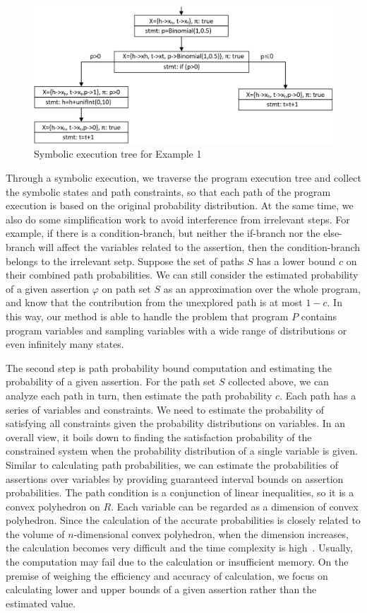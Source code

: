 \documentclass[runningheads]{llncs}
\begin{document}
\begin{figure}[h]
	\centering
	\includegraphics[scale=0.6]{img/executionTree}
	\caption{Symbolic execution tree for Example 1}
	\label{executionTree}
\end{figure}

Through a symbolic execution, we traverse the program execution tree and collect the symbolic states and path constraints, so that each path of the program execution is based on the original probability distribution. At the same time, we also do some simplification work to avoid interference from irrelevant steps. For example, if there is a condition-branch, but neither the if-branch nor the else-branch will affect the variables related to the assertion, then the condition-branch belongs to the irrelevant setp.
Suppose the set of paths $S$ has a lower bound $c$ on their combined path probabilities. We can still consider the estimated probability of a given assertion $\varphi$ on path set $S$ as an approximation over the whole program, and know that the contribution from the unexplored path is at most $1-c$. In this way, our method is able to handle the problem that program $P$ contains program variables and sampling variables with a wide range of distributions or even infinitely many states. 

The second step is path probability bound computation and estimating the probability of a given assertion. 
For the path set $S$ collected above, we can analyze each path in turn, then estimate the path probability $c$. Each path has a series of variables and constraints. We need to estimate the probability of satisfying all constraints given the probability distributions on variables. In an overall view, it boils down to finding the satisfaction probability of the constrained system when the probability distribution of a single variable is given. Similar to calculating path probabilities, we can estimate the probabilities of assertions over variables by providing guaranteed interval bounds on assertion probabilities. The path condition is a conjunction of linear inequalities, so it is a convex polyhedron on $R$. Each variable can be regarded as a dimension of convex polyhedron.
Since the calculation of the accurate probabilities is closely related to the volume of $n$-dimensional convex polyhedron, when the dimension increases, the calculation becomes very difficult and the time complexity is high~\cite{Arora1998Proof}. Usually, the computation may fail due to the calculation or insufficient memory. 
On the premise of weighing the efficiency and accuracy of calculation, we focus on calculating lower and upper bounds of a given assertion rather than the estimated value. 
\end{document}
